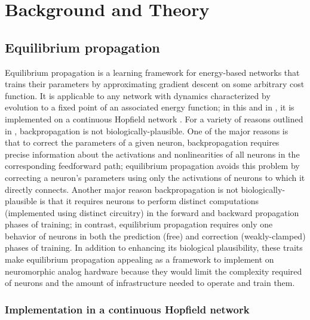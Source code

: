 \documentclass[format=sigconf]{acmart}
\begin{document}
\section{Background and Theory}

\subsection{Equilibrium propagation}
\label{sec:eqp_formulation}

Equilibrium propagation \cite{scellier17} is a learning framework for energy-based networks that trains their parameters by approximating gradient descent on some arbitrary cost function. It is applicable to any network with dynamics characterized by evolution to a fixed point of an associated energy function; in this and in \cite{scellier17}, it is implemented on a continuous Hopfield network \cite{hopfield1984}. For a variety of reasons outlined in \cite{bengio2015}, backpropagation is not biologically-plausible. One of the major reasons is that to correct the parameters of a given neuron, backpropagation requires precise information about the activations and nonlinearities of all neurons in the corresponding feedforward path; equilibrium propagation avoids this problem by correcting a neuron's parameters using only the activations of neurons to which it directly connects. Another major reason backpropagation is not biologically-plausible is that it requires neurons to perform distinct computations (implemented using distinct circuitry) in the forward and backward propagation phases of training; in contrast, equilibrium propagation requires only one behavior of neurons in both the prediction (free) and correction (weakly-clamped) phases of training. In addition to enhancing its biological plausibility, these traits make equilibrium propagation appealing as a framework to implement on neuromorphic analog hardware because they would limit the complexity required of neurons and the amount of infrastructure needed to operate and train them.

\subsubsection{Implementation in a continuous Hopfield network}
\end{document}
